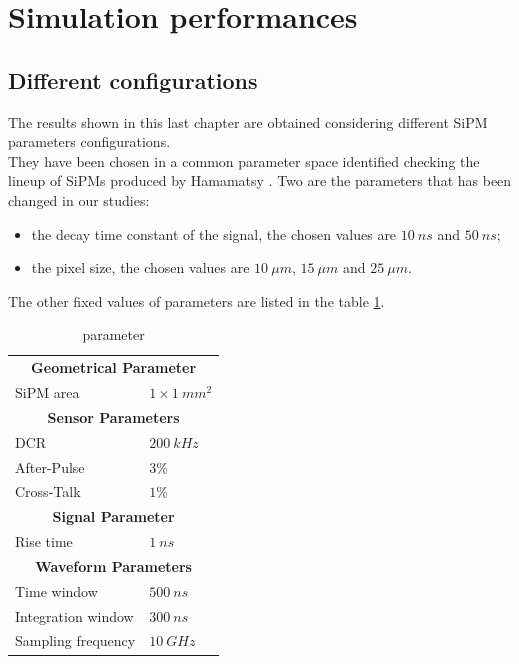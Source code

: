\section{Simulation performances} \label{sec:Sim_perf}

\subsection{Different configurations} \label{subsec:SiPM_conf}
The results shown in this last chapter are obtained considering different SiPM parameters configurations.\\
They have been chosen in a common parameter space identified checking the lineup of SiPMs produced by Hamamatsy \cite{SiPM_lineup}. 
Two are the parameters that has been changed in our studies: 
\begin{itemize}
	\item the decay time constant of the signal, the chosen values are $10\ ns$ and $50\ ns$;
	\item the pixel size, the chosen values are $10\ \mu m$, $15\ \mu m$ and $25\ \mu m$.
\end{itemize}

The other fixed values of parameters are listed in the table \ref{tab:SiPM_par}.\\

\begin{table}
	\centering
	\setlength{\tabcolsep}{18pt}
	\begin{tabular}{ll}
		\toprule
		\multicolumn{2}{c}{\textbf{Geometrical Parameter}}	\\
		SiPM area	& $1 \times 1\ mm^2$	\\
		\midrule
		\multicolumn{2}{c}{\textbf{Sensor Parameters}}	\\
		DCR			& $200 \ kHz$	\\
		After-Pulse	& $3\% $	\\
		Cross-Talk	& $1\% $	\\
		\midrule
		\multicolumn{2}{c}{\textbf{Signal Parameter}}	\\
		Rise time	& $1\ ns$	\\
		\midrule
		\multicolumn{2}{c}{\textbf{Waveform Parameters}}	\\
		Time window	& $500 \ ns$	\\
		Integration window	& $300 \ ns$	\\
		Sampling frequency	& $10\ GHz$	\\
		\bottomrule
	\end{tabular}
	\caption{parameter}
	\label{tab:SiPM_par}
\end{table}

